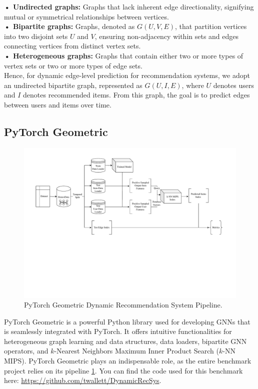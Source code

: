 \documentclass{scrartcl}
\begin{document}
\textbf{• Undirected graphs:} Graphs that lack inherent edge directionality, signifying mutual or symmetrical relationships between vertices. \\ 

\textbf{• Bipartite graphs:} Graphs, denoted as $G(U, V, E)$, that partition vertices into two disjoint sets $U$ and $V$, ensuring non-adjacency within sets and edges connecting vertices from distinct vertex sets. \\

\textbf{• Heterogeneous graphs:} Graphs that contain either two or more types of vertex sets or two or more types of edge sets. \\ 

Hence, for dynamic edge-level prediction for recommendation systems, we adopt an undirected bipartite graph, represented as $G(U, I, E)$, where $U$ denotes users and $I$ denotes recommended items. From this graph, the goal is to predict edges between users and items over time.

\subsection{PyTorch Geometric}

\begin{figure}
    \centering
    \includegraphics[width=\linewidth]{imgs/PyTorchPipeline.drawio.pdf}
    \caption{PyTorch Geometric Dynamic Recommendation System Pipeline.}
    \label{fig:pytorch_geometric_pipeline}
\end{figure}

\quad PyTorch Geometric is a powerful Python library used for developing GNNs that is seamlessly integrated with PyTorch. It offers intuitive functionalities for heterogeneous graph learning and data structures, data loaders, bipartite GNN operators, and $k$-Nearest Neighbors Maximum Inner Product Search ($k$-NN MIPS). PyTorch Geometric plays an indispensable role, as the entire benchmark project relies on its pipeline \ref{fig:pytorch_geometric_pipeline}. You can find the code used for this benchmark here: \href{https://github.com/twallett/DynamicRecSys}{https://github.com/twallett/DynamicRecSys}. 
\end{document}
